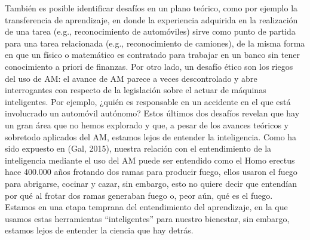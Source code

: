 También es posible identificar desafíos en un plano teórico, como por ejemplo la transferencia de aprendizaje, en donde la experiencia adquirida en la realización de una tarea (e.g., reconocimiento de automóviles) sirve como punto de partida para una tarea relacionada (e.g., reconocimiento de camiones), de la misma forma en que un físico o matemático es contratado para trabajar en un banco sin tener conocimiento a priori de finanzas. Por otro lado, un desafío ético son los riegos del uso de AM: el avance de AM parece a veces descontrolado y abre interrogantes con respecto de la legislación sobre el actuar de máquinas inteligentes. Por ejemplo, ¿quién es responsable en un accidente en el que está involucrado un automóvil autónomo? Estos últimos dos desafíos revelan que hay un gran área que no hemos explorado y que, a pesar de los avances teóricos y sobretodo aplicados del AM, estamos lejos de entender la inteligencia. Como ha sido expuesto en (Gal, 2015), nuestra relación con el entendimiento de la inteligencia mediante el uso del AM puede ser entendido como el Homo erectus hace 400.000 años frotando dos ramas para producir fuego, ellos usaron el fuego para abrigarse, cocinar y cazar, sin embargo, esto no quiere decir que entendían por qué al frotar dos ramas generaban fuego o, peor aún, qué es el fuego. Estamos en una etapa temprana del entendimiento del aprendizaje, en la que usamos estas herramientas “inteligentes” para nuestro bienestar, sin embargo, estamos lejos de entender la ciencia que hay detrás. 
    
